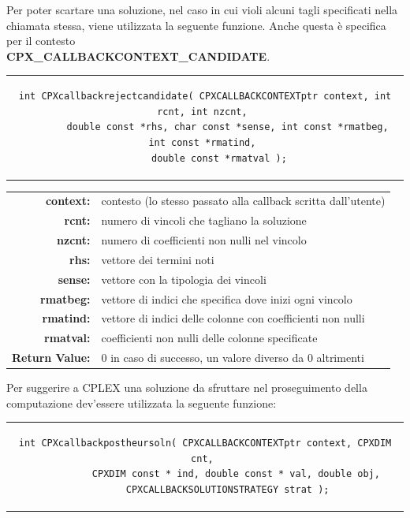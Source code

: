 Per poter scartare una soluzione, nel caso in cui violi alcuni tagli specificati nella chiamata stessa, viene utilizzata la seguente funzione. Anche questa è specifica per il contesto 
\\\textbf{CPX\_CALLBACKCONTEXT\_CANDIDATE}.
\begin{center}
\begin{tabular}{c}
\begin{lstlisting}[linewidth=420pt, basicstyle=\footnotesize\sffamily,] 
int CPXcallbackrejectcandidate( CPXCALLBACKCONTEXTptr context, int rcnt, int nzcnt, 
		double const *rhs, char const *sense, int const *rmatbeg, int const *rmatind, 
		double const *rmatval );   
\end{lstlisting}
\end{tabular}
\end{center}
\begin{table}[h]
\centering
\begin{tabular}{rl}
\textbf{context:} & {contesto (lo stesso passato alla callback scritta dall'utente)}\\
\textbf{rcnt:} & {numero di vincoli che tagliano la soluzione}\\
\textbf{nzcnt:} & {numero di coefficienti non nulli nel vincolo}\\
\textbf{rhs:} & {vettore dei termini noti}\\
\textbf{sense:} & {vettore con la tipologia dei vincoli}\\
\textbf{rmatbeg:} & {vettore di indici che specifica dove inizi ogni vincolo}\\
\textbf{rmatind:} & {vettore di indici delle colonne con coefficienti non nulli}\\
\textbf{rmatval:} & {coefficienti non nulli delle colonne specificate}\\
\textbf{Return Value:} & {0 in caso di successo, un valore diverso da 0 altrimenti}\\
\end{tabular}
\end{table}
Per suggerire a CPLEX una soluzione da sfruttare nel proseguimento della computazione dev'essere utilizzata la seguente funzione:
\begin{center}
\begin{tabular}{c}
\begin{lstlisting}[linewidth=365pt, basicstyle=\footnotesize\sffamily,]
int CPXcallbackpostheursoln( CPXCALLBACKCONTEXTptr context, CPXDIM cnt, 
			CPXDIM const * ind, double const * val, double obj, 
			CPXCALLBACKSOLUTIONSTRATEGY strat );    
\end{lstlisting}
\end{tabular}
\end{center}
